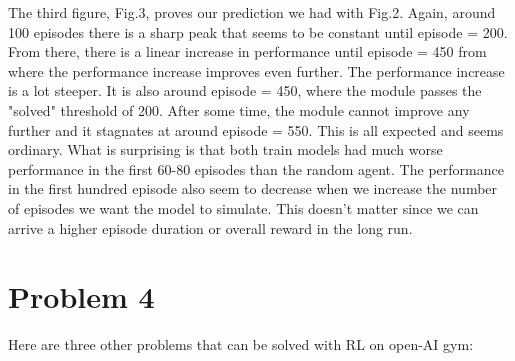 \documentclass{article}
\numberwithin{equation}{section}
\numberwithin{equation}{section}
\begin{document}
The third figure, Fig.3, proves our prediction we had with Fig.2. Again, around 100 episodes there is a sharp peak that seems to be constant until episode = 200. From there, there is a linear increase in performance until episode = 450 from where the performance increase improves even further. The performance increase is a lot steeper. It is also around episode = 450, where the module passes the "solved" threshold of 200. After some time, the module cannot improve any further and it stagnates at around episode = 550. This is all expected and seems ordinary. What is surprising is that both train models had much worse performance in the first 60-80 episodes than the random agent. The performance in the first hundred episode also seem to decrease when we increase the number of episodes we want the model to simulate. This doesn't matter since we can arrive a higher episode duration or overall reward in the long run.


\section{Problem 4}
Here are three other problems that can be solved with RL on open-AI gym:
\end{document}
